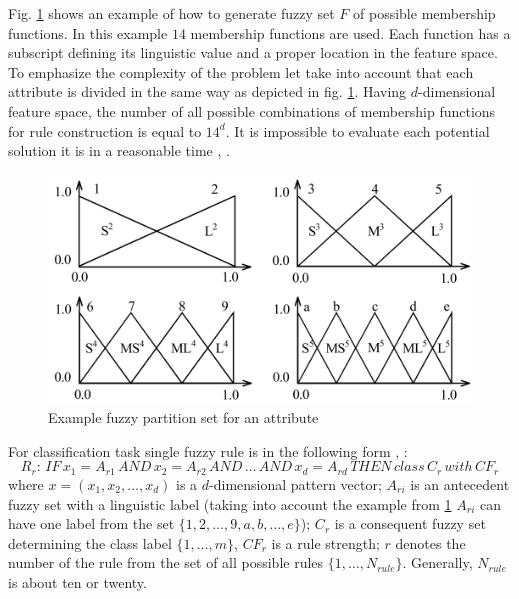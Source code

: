Fig. \ref{fig:fuzzy_example} shows an example of how to generate fuzzy set $F$ of
possible membership functions. In this example $14$ membership functions are used. 
Each function has a subscript defining its linguistic value and a proper
location in the feature space. To emphasize the complexity of the problem let take 
into account that each attribute is divided in the same way as depicted in fig. \ref{fig:fuzzy_example}. 
Having $d$-dimensional feature space, the number of all possible combinations of membership functions for
rule construction is equal to $14^d$. It is impossible to evaluate each potential solution it is
in a reasonable time \cite{bib27}, \cite{bib33}. 
\begin{figure}[H]
    \begin{center}
        \includegraphics[width=\textwidth]{fig/fuzzy_example.png}
    \end{center}
    \caption{Example fuzzy partition set for an attribute}
    \label{fig:fuzzy_example}
\end{figure}
For classification task single fuzzy rule is in the following form
\cite{bib30}, \cite{bib20}:
$$R_r:\, IF\, x_1=A_{r1}\, AND\, x_2=A_{r2}\, AND\, \ldots\, AND\, x_d=A_{rd}\, THEN\,
class\, C_r\, with \, CF_r$$
where $x=(x_1, x_2, \ldots, x_d)$ is a $d$-dimensional pattern vector; $A_{ri}$
is an antecedent fuzzy set with a linguistic label (taking into account the
example from \ref{fig:fuzzy_example} $A_{ri}$ can have one label from the set
$\{1, 2, \ldots, 9, a, b, \ldots, e \}$); $C_r$ is a consequent fuzzy set
determining the class label $\{1, \ldots, m\}$, $CF_r$ is a rule strength; $r$
denotes the number of the rule from the set of all possible rules $\{1, \ldots, N_{rule}\}$. 
Generally, $N_{rule}$ is about ten or twenty. 
